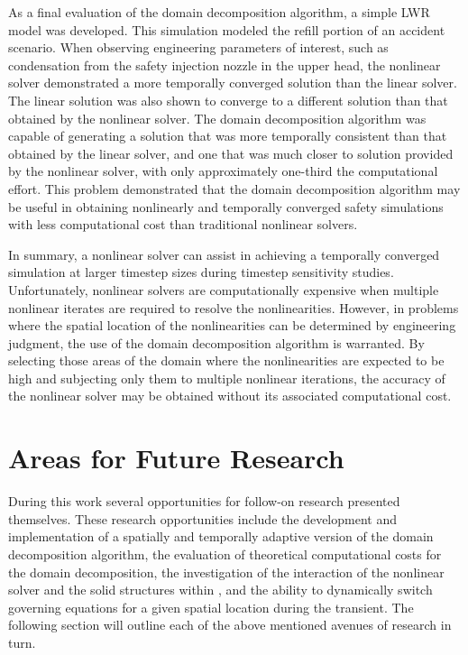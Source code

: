 As a final evaluation of the domain decomposition algorithm, a simple LWR model was developed.
This simulation modeled the refill portion of an accident scenario.
When observing engineering parameters of interest, such as condensation from the safety injection nozzle in the upper head, the nonlinear solver demonstrated a more temporally converged solution than the linear solver.
The linear solution was also shown to converge to a different solution than that obtained by the nonlinear solver.
The domain decomposition algorithm was capable of generating a solution that was more temporally consistent than that obtained by the linear solver, and one that was much closer to solution provided by the nonlinear solver, with only approximately one-third the computational effort.
This problem demonstrated that the domain decomposition algorithm may be useful in obtaining nonlinearly and temporally converged safety simulations with less computational cost than traditional nonlinear solvers.

In summary, a nonlinear solver can assist in achieving a temporally converged simulation at larger timestep sizes during timestep sensitivity studies.
Unfortunately, nonlinear solvers are computationally expensive when multiple nonlinear iterates are required to resolve the nonlinearities.
However, in problems where the spatial location of the nonlinearities can be determined by engineering judgment, the use of the domain decomposition algorithm is warranted.
By selecting those areas of the domain where the nonlinearities are expected to be high and subjecting only them to multiple nonlinear iterations, the accuracy of the nonlinear solver may be obtained without its associated computational cost.

\section{Areas for Future Research}
\label{sect:futureWork}
During this work several opportunities for follow-on research presented themselves.
These research opportunities include the development and implementation of a spatially and temporally adaptive version of the domain decomposition algorithm, the evaluation of theoretical computational costs for the domain decomposition, the investigation of the interaction of the nonlinear solver and the solid structures within \cobra{}, and the ability to dynamically switch governing equations for a given spatial location during the transient.
The following section will outline each of the above mentioned avenues of research in turn.

